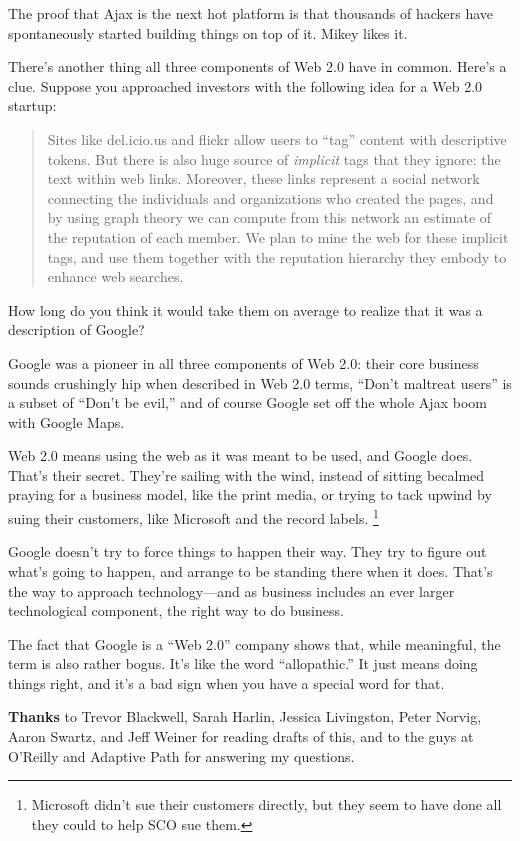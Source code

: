 The proof that Ajax is the next hot platform is that thousands of
hackers have spontaneously started building things on top of it. Mikey
likes it.

There's another thing all three components of Web 2.0 have in common.
Here's a clue. Suppose you approached investors with the following idea
for a Web 2.0 startup:

\begin{quote}
Sites like del.icio.us and flickr allow users to ``tag'' content with
descriptive tokens. But there is also huge source of \emph{implicit}
tags that they ignore: the text within web links. Moreover, these links
represent a social network connecting the individuals and organizations
who created the pages, and by using graph theory we can compute from
this network an estimate of the reputation of each member. We plan to
mine the web for these implicit tags, and use them together with the
reputation hierarchy they embody to enhance web searches.
\end{quote}

How long do you think it would take them on average to realize that it
was a description of Google?

Google was a pioneer in all three components of Web 2.0: their core
business sounds crushingly hip when described in Web 2.0 terms, ``Don't
maltreat users'' is a subset of ``Don't be evil,'' and of course Google
set off the whole Ajax boom with Google Maps.

Web 2.0 means using the web as it was meant to be used, and Google does.
That's their secret. They're sailing with the wind, instead of sitting
becalmed praying for a business model, like the print media, or trying
to tack upwind by suing their customers, like Microsoft and the record
labels. \footnote{Microsoft didn't sue their customers directly, but they seem to
have done all they could to help SCO sue them.}

Google doesn't try to force things to happen their way. They try to
figure out what's going to happen, and arrange to be standing there when
it does. That's the way to approach technology---and as business
includes an ever larger technological component, the right way to do
business.

The fact that Google is a ``Web 2.0'' company shows that, while
meaningful, the term is also rather bogus. It's like the word
``allopathic.'' It just means doing things right, and it's a bad sign
when you have a special word for that.


\textbf{Thanks} to Trevor Blackwell, Sarah Harlin, Jessica Livingston,
Peter Norvig, Aaron Swartz, and Jeff Weiner for reading drafts of this,
and to the guys at O'Reilly and Adaptive Path for answering my
questions.